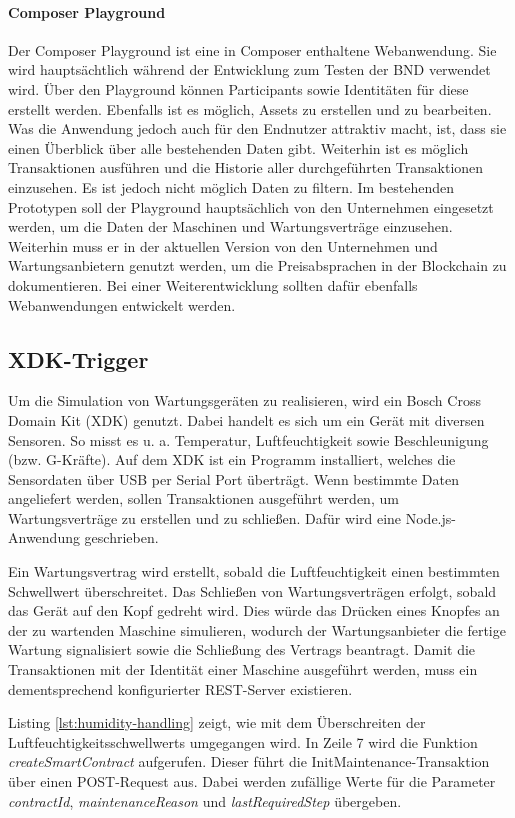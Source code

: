 \paragraph{Composer Playground}
Der Composer Playground ist eine in Composer enthaltene Webanwendung. Sie wird hauptsächtlich während der Entwicklung zum Testen der \acs{BND} verwendet wird. Über den Playground können Participants sowie Identitäten für diese erstellt werden. Ebenfalls ist es möglich, Assets zu erstellen und zu bearbeiten. Was die Anwendung jedoch auch für den Endnutzer attraktiv macht, ist, dass sie einen Überblick über alle bestehenden Daten gibt. Weiterhin ist es möglich Transaktionen ausführen und die Historie aller durchgeführten Transaktionen einzusehen. Es ist jedoch nicht möglich Daten zu filtern. Im bestehenden Prototypen soll der Playground hauptsächlich von den Unternehmen eingesetzt werden, um die Daten der Maschinen und Wartungsverträge einzusehen. Weiterhin muss er in der aktuellen Version von den Unternehmen und Wartungsanbietern genutzt werden, um die Preisabsprachen in der Blockchain zu dokumentieren. Bei einer Weiterentwicklung sollten dafür ebenfalls Webanwendungen entwickelt werden.

\subsection{XDK-Trigger}
Um die Simulation von Wartungsgeräten zu realisieren, wird ein Bosch Cross Domain Kit (XDK) genutzt. Dabei handelt es sich um ein Gerät mit diversen Sensoren. So misst es u. a. Temperatur, Luftfeuchtigkeit sowie Beschleunigung (bzw. G-Kräfte). Auf dem XDK ist ein Programm installiert, welches die Sensordaten über USB per Serial Port überträgt. Wenn bestimmte Daten angeliefert werden, sollen Transaktionen ausgeführt werden, um Wartungsverträge zu erstellen und zu schließen. Dafür wird eine Node.js-Anwendung geschrieben.

Ein Wartungsvertrag wird erstellt, sobald die Luftfeuchtigkeit einen bestimmten Schwellwert überschreitet. Das Schließen von Wartungsverträgen erfolgt, sobald das Gerät auf den Kopf gedreht wird. Dies würde das Drücken eines Knopfes an der zu wartenden Maschine simulieren, wodurch der Wartungsanbieter die fertige Wartung signalisiert sowie die Schließung des Vertrags beantragt. Damit die Transaktionen mit der Identität einer Maschine ausgeführt werden, muss ein dementsprechend konfigurierter REST-Server existieren. 

Listing \ref{lst:humidity-handling} zeigt, wie mit dem Überschreiten der Luftfeuchtigkeitsschwellwerts umgegangen wird. In Zeile 7 wird die Funktion \textit{createSmartContract} aufgerufen. Dieser führt die InitMaintenance-Transaktion über einen POST-Request aus. Dabei werden zufällige Werte für die Parameter \textit{contractId}, \textit{maintenanceReason} und \textit{lastRequiredStep} übergeben.

